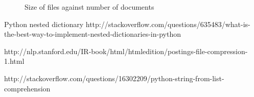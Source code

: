 \documentclass[paper=a4, fontsize=11pt]{scrartcl}
\numberwithin{equation}{section}		%
\numberwithin{figure}{section}			%
\numberwithin{table}{section}				%
\begin{document}
\begin{figure}[h]
\centering
{}
\caption{Size of files against number of documents}
\end{figure}

\clearpage

\begin{thebibliography}{1}

Python nested dictionary http://stackoverflow.com/questions/635483/what-is-the-best-way-to-implement-nested-dictionaries-in-python

 http://nlp.stanford.edu/IR-book/html/htmledition/postings-file-compression-1.html

 http://stackoverflow.com/questions/16302209/python-string-from-list-comprehension


  \end{thebibliography}

\end{document}
